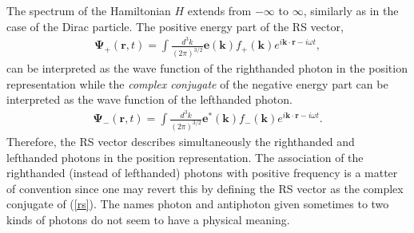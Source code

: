 \documentclass[onecolumn,aps,pra,12pt]{revtex4-1}
\begin{document}
The spectrum of the Hamiltonian $H$ extends from $-\infty$ to $\infty$, similarly as in the case of the Dirac particle. The positive energy part of the RS vector,
\begin{align}\label{plus}
{\bm \Psi}_+(\bm r,t)=\int\!\frac{d^3k}{(2\pi)^{3/2}}{\bm e}(\bm k)f_+(\bm k)e^{i\bm k\cdot\bm r-i\omega t},
\end{align}
can be interpreted as the wave function of the righthanded photon in the position representation while the {\em complex conjugate} of the negative energy part can be interpreted as the wave function of the lefthanded photon.
\begin{align}\label{min}
{\bm \Psi}_-(\bm r,t)=\int\!\frac{d^3k}{(2\pi)^{3/2}}{\bm e}^*(\bm k)f_-(\bm k)e^{i\bm k\cdot\bm r-i\omega t}.
\end{align}
Therefore, the RS vector describes simultaneously the righthanded and lefthanded photons in the position representation. The association of the righthanded (instead of lefthanded) photons with positive frequency is a matter of convention since one may revert this by defining the RS vector as the complex conjugate of (\ref{rs}). The names photon and antiphoton given sometimes \cite{ole} to two kinds of photons do not seem to have a physical meaning.
\end{document}
